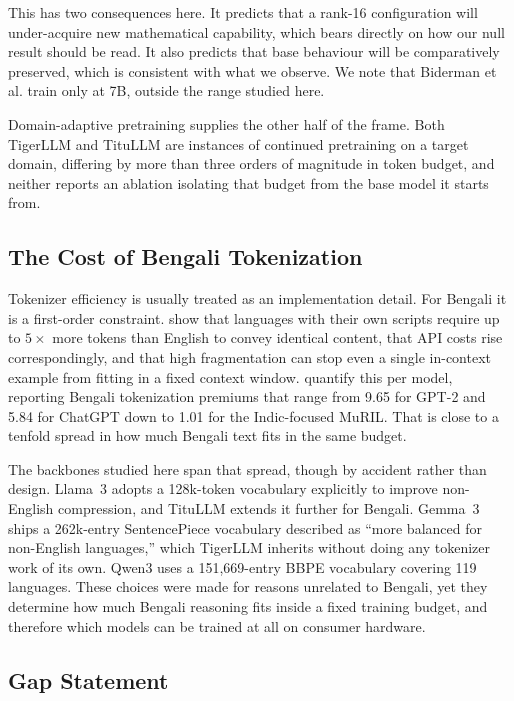 This has two consequences here. It predicts that a rank-16 configuration will
under-acquire new mathematical capability, which bears directly on how our null
result should be read. It also predicts that base behaviour will be
comparatively preserved, which is consistent with what we observe. We note that
Biderman et al. train only at 7B, outside the range studied here.

Domain-adaptive pretraining supplies the other half of the frame. Both TigerLLM
and TituLLM are instances of continued pretraining on a target domain, differing
by more than three orders of magnitude in token budget, and neither reports an
ablation isolating that budget from the base model it starts from.

\subsection{The Cost of Bengali Tokenization}

Tokenizer efficiency is usually treated as an implementation detail. For Bengali
it is a first-order constraint. \textcite{ahia2023alllanguages} %
show that languages with their own scripts require up to $5\times$ more tokens
than English to convey identical content, that API costs rise correspondingly,
and that high fragmentation can stop even a single in-context example from
fitting in a fixed context window. \textcite{petrov2023language} %
quantify this per model, reporting Bengali tokenization premiums that range from
9.65 for GPT-2 and 5.84 for ChatGPT down to 1.01 for the Indic-focused MuRIL.
That is close to a tenfold spread in how much Bengali text fits in the same
budget.

The backbones studied here span that spread, though by accident rather than
design. Llama~3 \parencite{llama3herd} %
adopts a 128k-token vocabulary explicitly to improve non-English compression,
and TituLLM extends it further for Bengali. Gemma~3 \parencite{gemma3} %
ships a 262k-entry SentencePiece vocabulary described as ``more balanced for
non-English languages,'' which TigerLLM inherits without doing any tokenizer
work of its own. Qwen3 \parencite{qwen3} %
uses a 151,669-entry BBPE vocabulary covering 119 languages. These choices were
made for reasons unrelated to Bengali, yet they determine how much Bengali
reasoning fits inside a fixed training budget, and therefore which models can be
trained at all on consumer hardware.

\subsection{Gap Statement}

